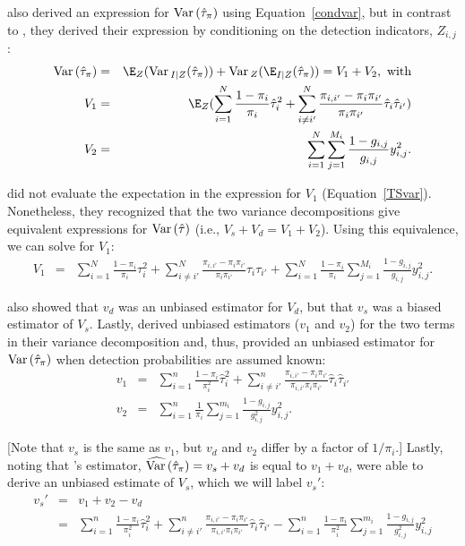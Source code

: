 \documentclass[nojss]{jss}
\def\VAR{{\rm Var}\,}
\begin{document}
\citet{thompsonSeb1996} also derived an expression for
$\VAR(\hat{\tau}_{\pi})$ using Equation~\ref{condvar}, but in
contrast to \citet{SS1989}, they derived their expression by
conditioning on the detection indicators, $Z_{i,j}$:
\begin{eqnarray}
 \VAR(\hat{\tau}_{\pi})& = & \E_{Z}(\VAR_{I|Z}(\hat{\tau}_{\pi})) + \VAR_{Z}(\E_{I|Z}(\hat{\tau}_{\pi})) =  V_{1}+V_{2}, \mbox{ with} \nonumber \\
\label{TSvar} V_{1} & = &  \E_{Z}(\sum_{i=1}^{N}\frac{1-\pi_{i}}{\pi_{i}}\hat{\tau}_{i}^{2}+\sum_{i \neq i'}^{N}\frac{\pi_{i,i'}-\pi_{i}\pi_{i'}}{\pi_{i}\pi_{i'}}\hat{\tau}_{i}\hat{\tau}_{i'})\\
V_{2} & = &
\sum_{i=1}^{N}\sum_{j=1}^{M_{i}}\frac{1-g_{i,j}}{g_{i,j}}y_{i,j}^2.
\end{eqnarray}

\citet{thompsonSeb1996} did not evaluate the expectation in the
expression for $V_{1}$ (Equation~\ref{TSvar}).  Nonetheless, they
recognized that the two variance decompositions give equivalent
expressions for $\VAR(\hat{\tau})$ (i.e., $V_{s}+V_{d} =
V_{1}+V_{2}$).  Using this equivalence, we can solve for $V_{1}$:
\begin{eqnarray}
V_{1} & =
&\sum_{i=1}^{N}\frac{1-\pi_{i}}{\pi_{i}}\tau_{i}^{2}+\sum_{i \neq
i'}^{N}\frac{\pi_{i,i'}-
\pi_{i}\pi_{i'}}{\pi_{i}\pi_{i'}}\tau_{i}\tau_{i'} +
\sum_{i=1}^{N}\frac{1-\pi_{i}}{\pi_{i}}\sum_{j=1}^{M_{i}}\frac{1-g_{i,j}}{g_{i,j}}y^{2}_{i,j}.
\end{eqnarray}


\citet{thompsonSeb1996} also showed that $v_{d}$ was an unbiased
estimator for $V_{d}$, but that
  $v_{s}$ was a biased estimator of
$V_{s}$. Lastly, \citet{thompsonSeb1996}  derived unbiased
estimators ($v_{1}$ and $v_{2}$) for the two terms in their variance
decomposition and, thus, provided an unbiased estimator for
$\VAR(\hat{\tau}_{\pi})$ when detection probabilities are assumed
known:
\begin{eqnarray}
v_{1} & = &  \sum_{i=1}^{n}\frac{1-\pi_{i}}{\pi_{i}^{2}}\hat{\tau}_{i}^{2}+\sum_{i \neq i'}^{n}\frac{\pi_{i,i'}-\pi_{i}\pi_{i'}}{\pi_{i,i'}\pi_{i}\pi_{i'}}\hat{\tau}_{i}\hat{\tau}_{i'}\\
v_{2} & = &
\sum_{i=1}^{n}\frac{1}{\pi_{i}}\sum_{j=1}^{m_{i}}\frac{1-g_{i,j}}{g_{i,j}^2}y_{i,j}^2.
\end{eqnarray}

[Note that $v_{s}$ is the same as $v_{1}$, but $v_{d}$ and $v_{2}$
differ by a factor of $1/\pi_{i}$.] Lastly, noting that
\citet{SS1989}'s estimator, $\widehat{\VAR}(\hat{\tau}_{\pi}) =
v_{s} + v_{d}$ is equal to $v_{1} + v_{d}$, \citet{thompsonSeb1996}
were able  to derive an unbiased estimate of $V_{s}$, which we will
label $v_{s}'$:
\begin{eqnarray}
v_{s}'& = &   v_{1}+v_{2}-v_{d} \nonumber \\
&= &
\sum_{i=1}^{n}\frac{1-\pi_{i}}{\pi_{i}^{2}}\hat{\tau}_{i}^{2}+\sum_{i
\neq
i'}^{n}\frac{\pi_{i,i'}-\pi_{i}\pi_{i'}}{\pi_{i,i'}\pi_{i}\pi_{i'}}\hat{\tau}_{i}\hat{\tau}_{i'}
-  \sum_{i=1}^{n}\frac{
1-\pi_{i}}{\pi_{i}^{2}}\sum_{j=1}^{m_{i}}\frac{1-g_{i,j}}{g_{i,j}^{2}}y_{i,j}^2
\end{eqnarray}
\end{document}
